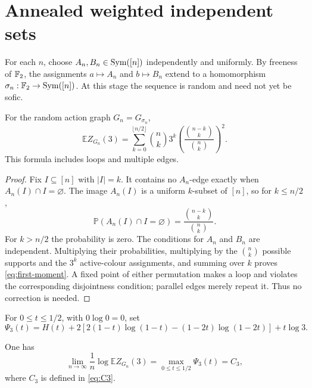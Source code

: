 \section{Annealed weighted independent sets}\label{sec:annealed}

For each $n$, choose $A_n,B_n\in\operatorname{Sym}([n])$ independently and uniformly.  By
freeness of $\mathbb F_2$, the assignments $a\mapsto A_n$ and $b\mapsto B_n$ extend
to a homomorphism $\sigma_n:\mathbb F_2\to\operatorname{Sym}([n])$.  At this stage the sequence is
random and need not yet be sofic.

\begin{lemma}\label{lem:first-moment}
For the random action graph $G_n=G_{\sigma_n}$,
\begin{equation}\label{eq:first-moment}
 \mathbb E Z_{G_n}(3)
 =\sum_{k=0}^{\lfloor n/2\rfloor}
 \binom nk3^k
 \left(\frac{\binom{n-k}{k}}{\binom nk}\right)^2.
\end{equation}
This formula includes loops and multiple edges.
\end{lemma}

\begin{proof}
Fix $I\subseteq[n]$ with $|I|=k$.  It contains no $A_n$-edge exactly when
$A_n(I)\cap I=\varnothing$.  The image $A_n(I)$ is a uniform $k$-subset of
$[n]$, so for $k\le n/2$,
\[
 \mathbb P(A_n(I)\cap I=\varnothing)
 =\frac{\binom{n-k}{k}}{\binom nk}.
\]
For $k>n/2$ the probability is zero.  The conditions for $A_n$ and $B_n$ are
independent.  Multiplying their probabilities, multiplying by the
$\binom nk$ possible supports and the $3^k$ active-colour assignments, and
summing over $k$ proves \eqref{eq:first-moment}.  A fixed point of either
permutation makes a loop and violates the corresponding disjointness
condition; parallel edges merely repeat it.  Thus no correction is needed.
\end{proof}

For $0\le t\le1/2$, with $0\log0=0$, set
\begin{equation}\label{eq:Psi}
 \Psi_3(t)=H(t)+2\left[
 2(1-t)\log(1-t)-(1-2t)\log(1-2t)\right]+t\log3.
\end{equation}

\begin{proposition}\label{prop:annealed}
One has
\begin{equation}\label{eq:annealed-limit}
 \lim_{n\to\infty}\frac1n\log\mathbb E Z_{G_n}(3)
 =\max_{0\le t\le1/2}\Psi_3(t)=C_3,
\end{equation}
where $C_3$ is defined in \eqref{eq:C3}.
\end{proposition}

